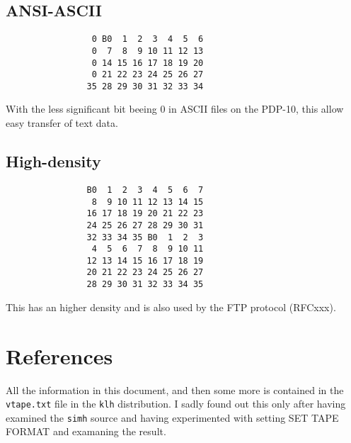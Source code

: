 \documentclass[a4paper,12pt]{article}
\newcommand{\file}[1]{\texttt{#1}}
\newcommand{\prog}[1]{\texttt{#1}}
\begin{document}
\subsection{ANSI-ASCII}

\begin{verbatim}
                 0 B0  1  2  3  4  5  6
                 0  7  8  9 10 11 12 13
                 0 14 15 16 17 18 19 20
                 0 21 22 23 24 25 26 27
                35 28 29 30 31 32 33 34
\end{verbatim}

With the less significant bit beeing 0 in ASCII files on the PDP-10, this
allow easy transfer of text data.

\subsection{High-density}

\begin{verbatim}
                B0  1  2  3  4  5  6  7
                 8  9 10 11 12 13 14 15
                16 17 18 19 20 21 22 23
                24 25 26 27 28 29 30 31
                32 33 34 35 B0  1  2  3
                 4  5  6  7  8  9 10 11
                12 13 14 15 16 17 18 19
                20 21 22 23 24 25 26 27
                28 29 30 31 32 33 34 35
\end{verbatim}

This has an higher density and is also used by the FTP protocol (RFCxxx).

\section{References}

All the information in this document, and then some more is contained in
the \file{vtape.txt} file in the \prog{klh} distribution.  I sadly found
out this only after having examined the \prog{simh} source and having
experimented with setting SET TAPE FORMAT and examaning the result.
\end{document}
